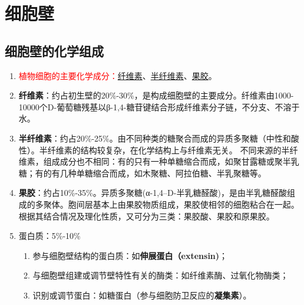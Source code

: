 \section{细胞壁}
\subsection{细胞壁的化学组成}
\begin{enumerate}
    \item \textcolor{red}{植物细胞的主要化学成分：}\uline{纤维素}、\uline{半纤维素}、\uline{果胶}。
    \item \textbf{纤维素}：约占初生壁的20\%-30\%，是构成细胞壁的主要成分。纤维素由1000-10000个D-葡萄糖残基以β-1,4-糖苷键结合形成纤维素分子链，不分支、不溶于水。
    \item \textbf{半纤维素}：约占20\%-25\%。由不同种类的糖聚合而成的异质多聚糖（中性和酸性）。半纤维素的结构较复杂，在化学结构上与纤维素无关。 不同来源的半纤维素，组成成分也不相同：有的只有一种单糖缩合而成，如聚甘露糖或聚半乳糖；有的有几种单糖缩合而成，如木聚糖、阿拉伯糖、半乳聚糖等。
    \item \textbf{果胶}：约占10\%-35\%。异质多聚糖(α-1,4–D-半乳糖醛酸)，是由半乳糖醛酸组成的多聚体。胞间层基本上由果胶物质组成，果胶使相邻的细胞粘合在一起。根据其结合情况及理化性质，又可分为三类：果胶酸、果胶和原果胶。 
    \item 蛋白质：5\%-10\%
    \begin{enumerate}
        \item 参与细胞壁结构的蛋白质：如\textbf{伸展蛋白（extensin)}；
        \item 与细胞壁组建或调节壁特性有关的酶类：如纤维素酶、过氧化物酶类；
        \item 识别或调节蛋白：如糖蛋白（参与细胞防卫反应的\textbf{凝集素}）。
    \end{enumerate}
\end{enumerate}
